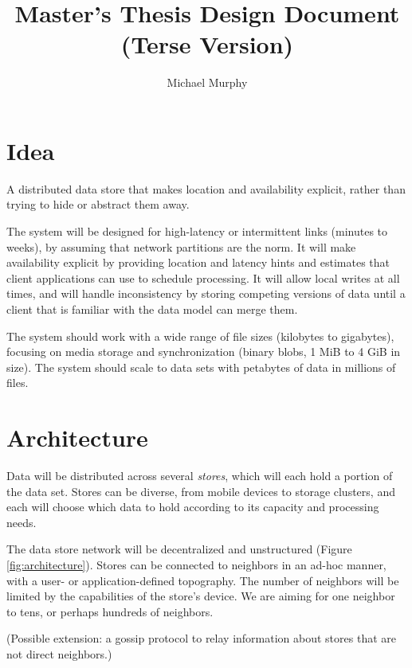 \documentclass[a4paper]{article}
\newcommand{\newterm}{\textit}
\begin{document}
\title{Master's Thesis Design Document \\ (Terse Version)}
\author{Michael Murphy}
\maketitle

\section{Idea}\label{idea}

A distributed data store that makes location and availability explicit, rather
than trying to hide or abstract them away.

The system will be designed for high-latency or intermittent links (minutes to
weeks), by assuming that network partitions are the norm. It will make
availability explicit by providing location and latency hints and estimates that
client applications can use to schedule processing. It will allow local writes
at all times, and will handle inconsistency by storing competing versions of
data until a client that is familiar with the data model can merge them.

The system should work with a wide range of file sizes (kilobytes to gigabytes),
focusing on media storage and synchronization (binary blobs, 1 MiB to 4 GiB in
size). The system should scale to data sets with petabytes of data in millions
of files.


\section{Architecture}\label{architecture}

Data will be distributed across several \newterm{stores}, which will each hold a
portion of the data set. Stores can be diverse, from mobile devices to storage
clusters, and each will choose which data to hold according to its capacity and
processing needs.

The data store network will be decentralized and unstructured (Figure
\ref{fig:architecture}). Stores can be connected to neighbors in an ad-hoc
manner, with a user- or application-defined topography. The number of neighbors
will be limited by the capabilities of the store's device. We are aiming for one
neighbor to tens, or perhaps hundreds of neighbors.

(Possible extension: a gossip protocol to relay information about stores that
are not direct neighbors.)
\end{document}

